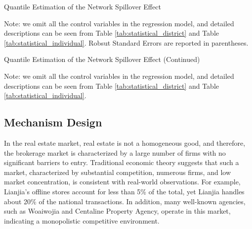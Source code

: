 \documentclass[11pt]{article}
\begin{document}
\begin{table}
  \begin{center}
    \begin{scriptsize}
      \caption{Quantile Estimation of the Network Spillover Effect}
      \label{tab:quantile_estimate_network_1}
      
    
    Note: we omit all the control variables in the regression model, and detailed descriptions can be seen from Table \ref{tab:statistical_district} and Table \ref{tab:statistical_individual}. Robsut Standard Errors are reported in parentheses.
    \end{scriptsize}
  \end{center}
\end{table}

\begin{table}
  \begin{center}
    \begin{scriptsize}
      \caption{Quantile Estimation of the Network Spillover Effect (Continued)}
      \label{tab:quantile_estimate_network_2}
      
    
    Note: we omit all the control variables in the regression model, and detailed descriptions can be seen from Table \ref{tab:statistical_district} and Table \ref{tab:statistical_individual}.
    \end{scriptsize}
  \end{center}
\end{table}

\subsection{Mechanism Design} \label{subsec:mechanism_network_design}

In the real estate market, real estate is not a homogeneous good, and therefore, the brokerage market is characterized by a large number of firms with no significant barriers to entry. Traditional economic theory suggests that such a market, characterized by substantial competition, numerous firms, and low market concentration, is consistent with real-world observations. For example, Lianjia's offline stores account for less than 5\% of the total, yet Lianjia handles about 20\% of the national transactions. In addition, many well-known agencies, such as Woaiwojia and Centaline Property Agency, operate in this market, indicating a monopolistic competitive environment.
\end{document}
